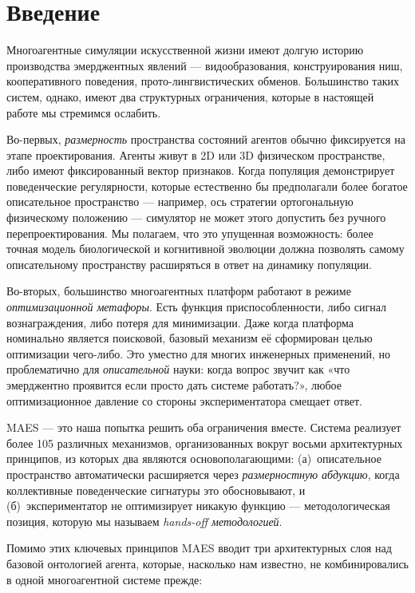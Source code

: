 \documentclass[11pt,a4paper]{article}
\begin{document}
\section{Введение}

Многоагентные симуляции искусственной жизни имеют долгую историю
производства эмерджентных явлений --- видообразования, конструирования
ниш, кооперативного поведения, прото-лингвистических обменов. Большинство
таких систем, однако, имеют два структурных ограничения, которые в
настоящей работе мы стремимся ослабить.

Во-первых, \emph{размерность} пространства состояний агентов обычно
фиксируется на этапе проектирования. Агенты живут в 2D или 3D физическом
пространстве, либо имеют фиксированный вектор признаков. Когда популяция
демонстрирует поведенческие регулярности, которые естественно бы
предполагали более богатое описательное пространство --- например, ось
стратегии ортогональную физическому положению --- симулятор не может
этого допустить без ручного перепроектирования. Мы полагаем, что это
упущенная возможность: более точная модель биологической и когнитивной
эволюции должна позволять самому описательному пространству расширяться
в ответ на динамику популяции.

Во-вторых, большинство многоагентных платформ работают в режиме
\emph{оптимизационной метафоры}. Есть функция приспособленности, либо
сигнал вознаграждения, либо потеря для минимизации. Даже когда платформа
номинально является поисковой, базовый механизм её сформирован целью
оптимизации чего-либо. Это уместно для многих инженерных применений, но
проблематично для \emph{описательной} науки: когда вопрос звучит как
«что эмерджентно проявится если просто дать системе работать?»,
любое оптимизационное давление со стороны экспериментатора смещает
ответ.

MAES --- это наша попытка решить оба ограничения вместе. Система
реализует более 105 различных механизмов, организованных вокруг восьми
архитектурных принципов, из которых два являются основополагающими:
(а)~описательное пространство автоматически расширяется через
\emph{размерностную абдукцию}, когда коллективные поведенческие
сигнатуры это обосновывают, и (б)~экспериментатор не оптимизирует
никакую функцию --- методологическая позиция, которую мы называем
\emph{hands-off методологией}.

Помимо этих ключевых принципов MAES вводит три архитектурных слоя над
базовой онтологией агента, которые, насколько нам известно, не
комбинировались в одной многоагентной системе прежде:
\end{document}
